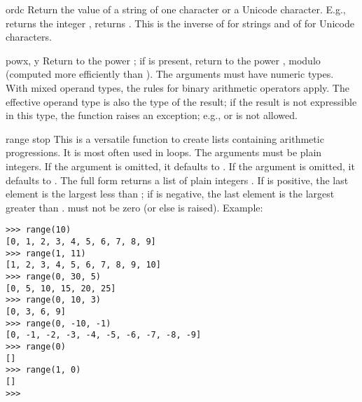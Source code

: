 \begin{funcdesc}{ord}{c}
  Return the \ASCII{} value of a string of one character or a Unicode
  character.  E.g.,  returns the integer ,
   returns .  This is the inverse of
   for strings and of  for Unicode
  characters.
\end{funcdesc}

\begin{funcdesc}{pow}{x, y}
  Return  to the power ; if  is present, return
   to the power , modulo  (computed more
  efficiently than ).
  The arguments must have
  numeric types.  With mixed operand types, the rules for binary
  arithmetic operators apply.  The effective operand type is also the
  type of the result; if the result is not expressible in this type, the
  function raises an exception; e.g.,  or  is not allowed.
\end{funcdesc}

\begin{funcdesc}{range}{ stop}
  This is a versatile function to create lists containing arithmetic
  progressions.  It is most often used in  loops.  The
  arguments must be plain integers.  If the  argument is
  omitted, it defaults to .  If the  argument is
  omitted, it defaults to .  The full form returns a list of
  plain integers .  If  is positive,
  the last element is the largest  less than ; if  is negative, the last
  element is the largest 
  greater than .   must not be zero (or else
   is raised).  Example:

\begin{verbatim}
>>> range(10)
[0, 1, 2, 3, 4, 5, 6, 7, 8, 9]
>>> range(1, 11)
[1, 2, 3, 4, 5, 6, 7, 8, 9, 10]
>>> range(0, 30, 5)
[0, 5, 10, 15, 20, 25]
>>> range(0, 10, 3)
[0, 3, 6, 9]
>>> range(0, -10, -1)
[0, -1, -2, -3, -4, -5, -6, -7, -8, -9]
>>> range(0)
[]
>>> range(1, 0)
[]
>>> 
\end{verbatim}
\end{funcdesc}

